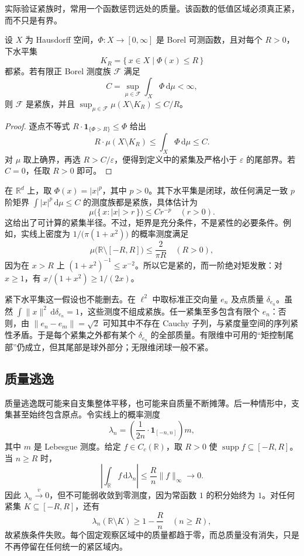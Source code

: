 \ProseParagraphBreak

实际验证紧族时，常用一个函数惩罚远处的质量。该函数的低值区域必须真正紧，而不只是有界。

\begin{proposition}\label{b1:prop:tight-coercive-bound}
设 \(X\) 为 Hausdorff 空间，\(\Phi:X\rightarrow[0,\infty]\) 是 Borel 可测函数，且对每个 \(R>0\)，下水平集
\[
 K_R=\{\,x\in X\mid\Phi(x)\leq R\,\}
\]
都紧。若有限正 Borel 测度族 \(\mathcal F\) 满足
\[
 C=\sup_{\mu\in\mathcal F}\int_X\Phi\,\mathrm d\mu<\infty,
\]
则 \(\mathcal F\) 是紧族，并且 \(\sup_{\mu\in\mathcal F}\mu(X\setminus K_R)\leq C/R\)。
\end{proposition}
\begin{proof}
逐点不等式 \(R\cdot\mathbf1_{\{\Phi>R\}}\leq\Phi\) 给出
\[
 R\cdot\mu(X\setminus K_R)
 \leq\int_X\Phi\,\mathrm d\mu\leq C.
\]
对 \(\mu\) 取上确界，再选 \(R>C/\varepsilon\)，便得到定义中的紧集及严格小于 \(\varepsilon\) 的尾部界。若 \(C=0\)，任取 \(R>0\) 即可。
\end{proof}

在 \(\mathbb R^d\) 上，取 \(\Phi(x)=|x|^p\)，其中 \(p>0\)。其下水平集是闭球，故任何满足一致 \(p\) 阶矩界 \(\int|x|^p\,\mathrm d\mu\leq C\) 的测度族都是紧族，具体估计为
\[
 \mu\bigl(\{\,x:|x|>r\,\}\bigr)\leq Cr^{-p}
 \quad(r>0).
\]
这给出了可计算的紧集半径。不过，矩界是充分条件，不是紧性的必要条件。例如，实线上密度为 \(1/\bigl(\pi(1+x^2)\bigr)\) 的概率测度满足
\[
 \mu\bigl(\mathbb R\setminus[-R,R]\bigr)
 \leq\frac{2}{\pi R}
 \quad(R>0),
\]
因为在 \(x>R\) 上 \((1+x^2)^{-1}\leq x^{-2}\)。所以它是紧的，而一阶绝对矩发散：对 \(x\geq1\)，有 \(x/(1+x^2)\geq1/(2x)\)。

\ProseParagraphBreak

紧下水平集这一假设也不能删去。在 \(\ell^2\) 中取标准正交向量 \(e_n\) 及点质量 \(\delta_{e_n}\)。虽然 \(\int\|x\|^2\,\mathrm d\delta_{e_n}=1\)，这些测度不组成紧族。任一紧集至多包含有限个 \(e_n\)：否则，由 \(\|e_n-e_m\|=\sqrt2\) 可知其中不存在 Cauchy 子列，与紧度量空间的序列紧性矛盾。于是每个紧集之外都有某个 \(\delta_{e_n}\) 的全部质量。有限维中可用的“矩控制尾部”仍成立，但其尾部是球外部分；无限维闭球一般不紧。

\subsection{质量逃逸}
\label{b1:subsec:120302}

质量逃逸既可能来自支集整体平移，也可能来自质量不断摊薄。后一种情形中，支集甚至始终包含原点。令实线上的概率测度
\[
 \lambda_n=\left(\frac1{2n}\cdot\mathbf1_{[-n,n]}\right)m,
\]
其中 \(m\) 是 Lebesgue 测度。给定 \(f\in C_c(\mathbb R)\)，取 \(R>0\) 使 \(\operatorname{supp}f\subseteq[-R,R]\)。当 \(n\geq R\) 时，
\[
 \left|\int_{\mathbb R}f\,\mathrm d\lambda_n\right|
 \leq\frac{R}{n}\|f\|_\infty\longrightarrow0.
\]
因此 \(\lambda_n\xrightarrow{v}0\)，但不可能弱收敛到零测度，因为常函数 \(1\) 的积分始终为 \(1\)。对任何紧集 \(K\subseteq[-R,R]\)，还有
\[
 \lambda_n(\mathbb R\setminus K)\geq1-\frac{R}{n}
 \quad(n\geq R),
\]
故紧族条件失败。每个固定观察区域中的质量都趋于零，而总质量没有消失，只是不再停留在任何统一的紧区域内。

